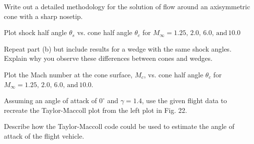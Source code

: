 \documentclass[../main.tex]{subfiles}
\begin{document}


Write out a detailed methodology for the solution of flow around an axisymmetric cone with a sharp nosetip.

Plot shock half angle \(\theta_s\) vs. cone half angle \(\theta_c\) for \(M_\infty=1.25,\,2.0,\,6.0,\,\textrm{and}\,10.0\)


Repeat part (b) but include results for a wedge with the same shock angles. 
Explain why you observe these differences between cones and wedges.


Plot the Mach number at the cone surface, \(M_c\), vs. cone half angle \(\theta_c\) for \(M_\infty=1.25,\,2.0,\,6.0,\,\textrm{and}\,10.0\).


Assuming an angle of attack of \(0^\circ\) and \(\gamma=1.4\), use the given flight data to recreate the Taylor-Maccoll plot from the left plot in Fig. 22.


Describe how the Taylor-Maccoll code could be used to estimate the angle of attack of the flight vehicle.
\end{document}

